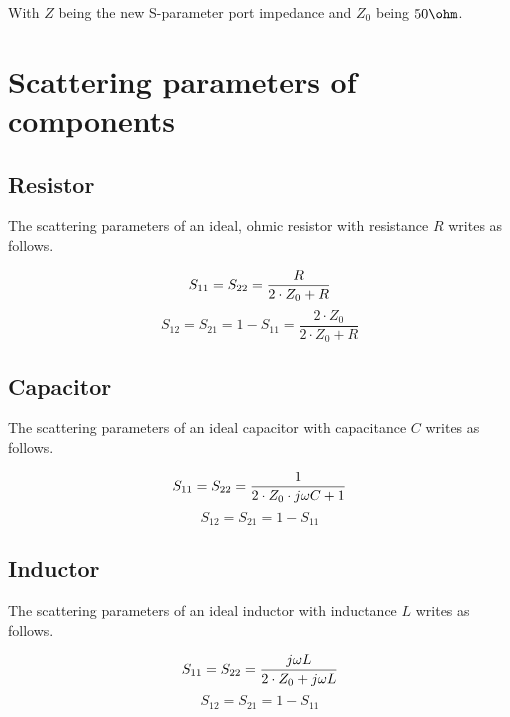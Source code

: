 With $Z$ being the new S-parameter port impedance and $Z_0$ being $50\ohm$.


\section{Scattering parameters of components}

\subsection{Resistor}

The scattering parameters of an ideal, ohmic resistor with resistance
$R$ writes as follows.

\begin{equation}
S_{11} = S_{22} = \frac{R}{2\cdot Z_0+R} \\
\end{equation}
\begin{equation}
S_{12} = S_{21} = 1-S_{11} = \frac{2\cdot Z_0}{2\cdot Z_0+R}
\end{equation}

\subsection{Capacitor}

The scattering parameters of an ideal capacitor with capacitance $C$
writes as follows.

\begin{equation}
S_{11} = S_{22} = \frac{1}{2\cdot Z_0\cdot j\omega C+1} \\
\end{equation}
\begin{equation}
S_{12} = S_{21} = 1-S_{11}
\end{equation}

\subsection{Inductor}

The scattering parameters of an ideal inductor with inductance $L$
writes as follows.

\begin{equation}
S_{11} = S_{22} = \frac{j\omega L}{2\cdot Z_0 + j\omega L} \\
\end{equation}
\begin{equation}
S_{12} = S_{21} = 1-S_{11}
\end{equation}

